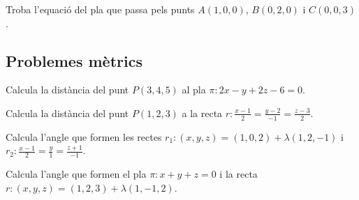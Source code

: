 \documentclass[12pt]{article}
\begin{document}
\begin{exercici}
Troba l'equació del pla que passa pels punts $A(1,0,0)$, $B(0,2,0)$ i $C(0,0,3)$.
\end{exercici}

\subsection{Problemes mètrics}

\begin{exercici}
Calcula la distància del punt $P(3,4,5)$ al pla $\pi: 2x - y + 2z - 6 = 0$.
\end{exercici}

\begin{exercici}
Calcula la distància del punt $P(1,2,3)$ a la recta $r: \frac{x-1}{2} = \frac{y-2}{-1} = \frac{z-3}{2}$.
\end{exercici}

\begin{exercici}
Calcula l'angle que formen les rectes $r_1: (x,y,z) = (1,0,2) + \lambda(1,2,-1)$ i $r_2: \frac{x-1}{2} = \frac{y}{1} = \frac{z+1}{-1}$.
\end{exercici}

\begin{exercici}
Calcula l'angle que formen el pla $\pi: x + y + z = 0$ i la recta $r: (x,y,z) = (1,2,3) + \lambda(1,-1,2)$.
\end{exercici}
\end{document}
